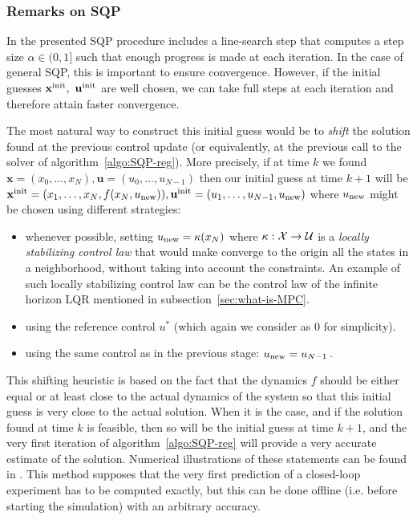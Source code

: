 \documentclass[12pt]{article}
\begin{document}
\subsubsection{Remarks on SQP}

In \cite{mpc-rti} the presented SQP procedure includes a line-search step that computes a step size $\alpha\in(0,1]$ such that enough progress is made at each iteration.
In the case of general SQP, this is important to ensure convergence.
However, if the initial guesses $\mathbf{x}^{\rm{init}},~\mathbf{u}^{\rm{init}}$ are well chosen, we can take full steps at each iteration and therefore attain faster convergence.

The most natural way to construct this initial guess would be to \textit{shift} the solution found at the previous control update (or equivalently, at the previous call to the solver of algorithm~\ref{algo:SQP-reg}).
More precisely, if at time $k$ we found $\mathbf{x}=(x_0,\ldots,x_N),\mathbf{u}=(u_0,\ldots,u_{N-1})$ then our initial guess at time $k+1$ will be $\mathbf{x}^{\rm{init}}=(x_1,\ldots,x_N,f(x_N,u_{\rm{new}})),\mathbf{u}^{\rm{init}}=(u_1,\ldots,u_{N-1},u_{\rm{new}})$ where $u_{\rm{new}}$ might be chosen using different strategies:
\begin{itemize}[label=\textbullet]
	\item whenever possible, setting $u_{\rm{new}}=\kappa(x_N)$ where $\kappa:\cal{X}\to\cal{U}$ is a \textit{locally stabilizing control law} that would make converge to the origin all the states in a neighborhood, without taking into account the constraints.
	An example of such locally stabilizing control law can be the control law of the infinite horizon LQR mentioned in subsection~\ref{sec:what-is-MPC}.

	\item using the reference control $u^*$ (which again we consider as $0$ for simplicity).

 	\item using the same control as in the previous stage: $u_{\rm{new}}=u_{N-1}$\,.
\end{itemize}

This shifting heuristic is based on the fact that the dynamics $f$ should be either equal or at least close to the actual dynamics of the system so that this initial guess is very close to the actual solution.
When it is the case, and if the solution found at time $k$ is feasible, then so will be the initial guess at time $k+1$, and the very first iteration of algorithm~\ref{algo:SQP-reg} will provide a very accurate estimate of the solution.
Numerical illustrations of these statements can be found in \cite{mpc-rti}.
This method supposes that the very first prediction of a closed-loop experiment has to be computed exactly, but this can be done offline (i.e. before starting the simulation) with an arbitrary accuracy.
\end{document}
